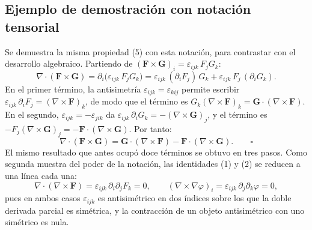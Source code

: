 \subsection{Ejemplo de demostración con notación tensorial}

Se demuestra la misma propiedad (5) con esta notación, para contrastar con el desarrollo algebraico. Partiendo de $(\mathbf{F} \times \mathbf{G})_i = \varepsilon_{ijk}\, F_j G_k$:
\[
\nabla \cdot (\mathbf{F} \times \mathbf{G})
= \partial_i \bigl( \varepsilon_{ijk}\, F_j G_k \bigr)
= \varepsilon_{ijk}\, (\partial_i F_j)\, G_k + \varepsilon_{ijk}\, F_j\, (\partial_i G_k).
\]
En el primer término, la antisimetría $\varepsilon_{ijk} = \varepsilon_{kij}$ permite escribir $\varepsilon_{ijk}\, \partial_i F_j = (\nabla \times \mathbf{F})_k$, de modo que el término es $G_k (\nabla \times \mathbf{F})_k = \mathbf{G} \cdot (\nabla \times \mathbf{F})$. En el segundo, $\varepsilon_{ijk} = -\varepsilon_{jik}$ da $\varepsilon_{ijk}\, \partial_i G_k = -(\nabla \times \mathbf{G})_j$, y el término es $-F_j (\nabla \times \mathbf{G})_j = -\mathbf{F} \cdot (\nabla \times \mathbf{G})$. Por tanto:
\[
\nabla \cdot (\mathbf{F} \times \mathbf{G}) = \mathbf{G} \cdot (\nabla \times \mathbf{F}) - \mathbf{F} \cdot (\nabla \times \mathbf{G}). \qquad \square
\]
El mismo resultado que antes ocupó doce términos se obtuvo en tres pasos. Como segunda muestra del poder de la notación, las identidades (1) y (2) se reducen a una línea cada una:
\[
\nabla \cdot (\nabla \times \mathbf{F}) = \varepsilon_{ijk}\, \partial_i \partial_j F_k = 0,
\qquad
(\nabla \times \nabla \varphi)_i = \varepsilon_{ijk}\, \partial_j \partial_k \varphi = 0,
\]
pues en ambos casos $\varepsilon_{ijk}$ es antisimétrico en dos índices sobre los que la doble derivada parcial es simétrica, y la contracción de un objeto antisimétrico con uno simétrico es nula.


